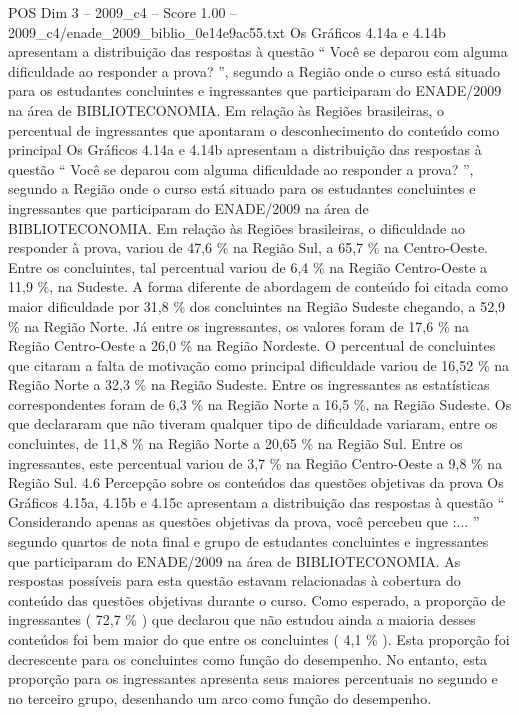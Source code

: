 \begin{textsample}{POS Dim 3 – 2009\_c4 – Score 1.00 – 2009\_c4/enade\_2009\_biblio\_0e14e9ac55.txt}
Os Gráficos 4.14a e 4.14b apresentam a distribuição das respostas à questão “ Você se deparou com alguma dificuldade ao responder a prova? ”, segundo a Região onde o curso está situado para os estudantes concluintes e ingressantes que participaram do ENADE/2009 na área de BIBLIOTECONOMIA.
Em relação às Regiões brasileiras, o percentual de ingressantes que apontaram o desconhecimento do conteúdo como principal Os Gráficos 4.14a e 4.14b apresentam a distribuição das respostas à questão “ Você se deparou com alguma dificuldade ao responder a prova? ”, segundo a Região onde o curso está situado para os estudantes concluintes e ingressantes que participaram do ENADE/2009 na área de BIBLIOTECONOMIA.
Em relação às Regiões brasileiras, o dificuldade ao responder à prova, variou de 47,6 \% na Região Sul, a 65,7 \% na Centro-Oeste.
Entre os concluintes, tal percentual variou de 6,4 \% na Região Centro-Oeste a 11,9 \%, na Sudeste.
A forma diferente de abordagem de conteúdo foi citada como maior dificuldade por 31,8 \% dos concluintes na Região Sudeste chegando, a 52,9 \% na Região Norte.
Já entre os ingressantes, os valores foram de 17,6 \% na Região Centro-Oeste a 26,0 \% na Região Nordeste.
O percentual de concluintes que citaram a falta de motivação como principal dificuldade variou de 16,52 \% na Região Norte a 32,3 \% na Região Sudeste.
Entre os ingressantes as estatísticas correspondentes foram de 6,3 \% na Região Norte a 16,5 \%, na Região Sudeste.
Os que declararam que não tiveram qualquer tipo de dificuldade variaram, entre os concluintes, de 11,8 \% na Região Norte a 20,65 \% na Região Sul.
Entre os ingressantes, este percentual variou de 3,7 \% na Região Centro-Oeste a 9,8 \% na Região Sul. 4.6 Percepção sobre os conteúdos das questões objetivas da prova Os Gráficos 4.15a, 4.15b e 4.15c apresentam a distribuição das respostas à questão “ Considerando apenas as questões objetivas da prova, você percebeu que :... ” segundo quartos de nota final e grupo de estudantes concluintes e ingressantes que participaram do ENADE/2009 na área de BIBLIOTECONOMIA.
As respostas possíveis para esta questão estavam relacionadas à cobertura do conteúdo das questões objetivas durante o curso.
Como esperado, a proporção de ingressantes ( 72,7 \% ) que declarou que não estudou ainda a maioria desses conteúdos foi bem maior do que entre os concluintes ( 4,1 \% ).
Esta proporção foi decrescente para os concluintes como função do desempenho.
No entanto, esta proporção para os ingressantes apresenta seus maiores percentuais no segundo e no terceiro grupo, desenhando um arco como função do desempenho.

\end{textsample}
